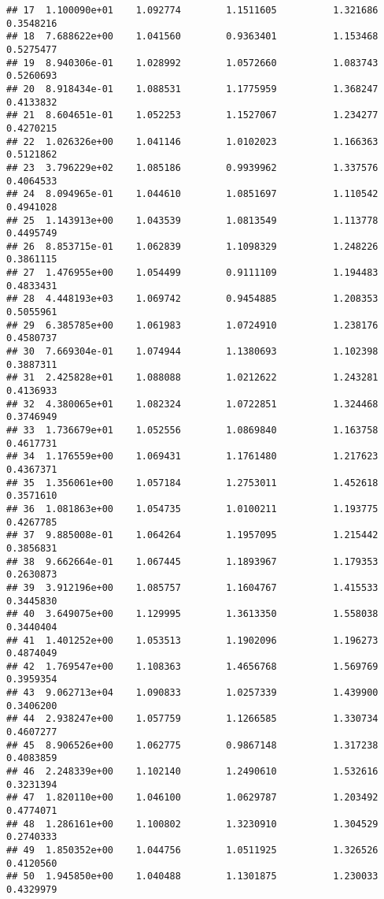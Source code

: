 \documentclass[]{article}
\begin{document}
\begin{verbatim}
## 17  1.100090e+01    1.092774        1.1511605          1.321686 0.3548216
## 18  7.688622e+00    1.041560        0.9363401          1.153468 0.5275477
## 19  8.940306e-01    1.028992        1.0572660          1.083743 0.5260693
## 20  8.918434e-01    1.088531        1.1775959          1.368247 0.4133832
## 21  8.604651e-01    1.052253        1.1527067          1.234277 0.4270215
## 22  1.026326e+00    1.041146        1.0102023          1.166363 0.5121862
## 23  3.796229e+02    1.085186        0.9939962          1.337576 0.4064533
## 24  8.094965e-01    1.044610        1.0851697          1.110542 0.4941028
## 25  1.143913e+00    1.043539        1.0813549          1.113778 0.4495749
## 26  8.853715e-01    1.062839        1.1098329          1.248226 0.3861115
## 27  1.476955e+00    1.054499        0.9111109          1.194483 0.4833431
## 28  4.448193e+03    1.069742        0.9454885          1.208353 0.5055961
## 29  6.385785e+00    1.061983        1.0724910          1.238176 0.4580737
## 30  7.669304e-01    1.074944        1.1380693          1.102398 0.3887311
## 31  2.425828e+01    1.088088        1.0212622          1.243281 0.4136933
## 32  4.380065e+01    1.082324        1.0722851          1.324468 0.3746949
## 33  1.736679e+01    1.052556        1.0869840          1.163758 0.4617731
## 34  1.176559e+00    1.069431        1.1761480          1.217623 0.4367371
## 35  1.356061e+00    1.057184        1.2753011          1.452618 0.3571610
## 36  1.081863e+00    1.054735        1.0100211          1.193775 0.4267785
## 37  9.885008e-01    1.064264        1.1957095          1.215442 0.3856831
## 38  9.662664e-01    1.067445        1.1893967          1.179353 0.2630873
## 39  3.912196e+00    1.085757        1.1604767          1.415533 0.3445830
## 40  3.649075e+00    1.129995        1.3613350          1.558038 0.3440404
## 41  1.401252e+00    1.053513        1.1902096          1.196273 0.4874049
## 42  1.769547e+00    1.108363        1.4656768          1.569769 0.3959354
## 43  9.062713e+04    1.090833        1.0257339          1.439900 0.3406200
## 44  2.938247e+00    1.057759        1.1266585          1.330734 0.4607277
## 45  8.906526e+00    1.062775        0.9867148          1.317238 0.4083859
## 46  2.248339e+00    1.102140        1.2490610          1.532616 0.3231394
## 47  1.820110e+00    1.046100        1.0629787          1.203492 0.4774071
## 48  1.286161e+00    1.100802        1.3230910          1.304529 0.2740333
## 49  1.850352e+00    1.044756        1.0511925          1.326526 0.4120560
## 50  1.945850e+00    1.040488        1.1301875          1.230033 0.4329979

\end{verbatim}
\end{document}
